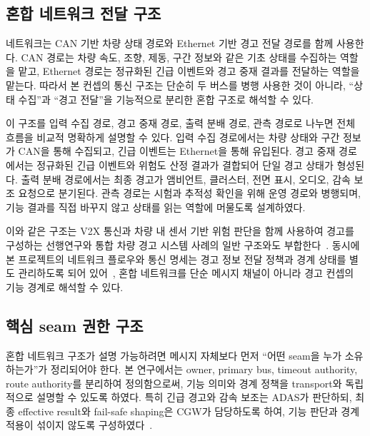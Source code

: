 \documentclass[11pt,a4paper]{article}
\begin{document}
\subsection{혼합 네트워크 전달 구조}

네트워크는 CAN 기반 차량 상태 경로와 Ethernet 기반 경고 전달 경로를 함께 사용한다. CAN 경로는 차량 속도, 조향, 제동, 구간 정보와 같은 기초 상태를 수집하는 역할을 맡고, Ethernet 경로는 정규화된 긴급 이벤트와 경고 중재 결과를 전달하는 역할을 맡는다. 따라서 본 컨셉의 통신 구조는 단순히 두 버스를 병행 사용한 것이 아니라, ``상태 수집''과 ``경고 전달''을 기능적으로 분리한 혼합 구조로 해석할 수 있다.

이 구조를 입력 수집 경로, 경고 중재 경로, 출력 분배 경로, 관측 경로로 나누면 전체 흐름을 비교적 명확하게 설명할 수 있다. 입력 수집 경로에서는 차량 상태와 구간 정보가 CAN을 통해 수집되고, 긴급 이벤트는 Ethernet을 통해 유입된다. 경고 중재 경로에서는 정규화된 긴급 이벤트와 위험도 산정 결과가 결합되어 단일 경고 상태가 형성된다. 출력 분배 경로에서는 최종 경고가 앰비언트, 클러스터, 전면 표시, 오디오, 감속 보조 요청으로 분기된다. 관측 경로는 시험과 추적성 확인을 위해 운영 경로와 병행되며, 기능 결과를 직접 바꾸지 않고 상태를 읽는 역할에 머물도록 설계하였다.

이와 같은 구조는 V2X 통신과 차량 내 센서 기반 위험 판단을 함께 사용하여 경고를 구성하는 선행연구와 통합 차량 경고 시스템 사례의 일반 구조와도 부합한다~\cite{sensors_v2x_collision,nhtsa_ivbss}. 동시에 본 프로젝트의 네트워크 플로우와 통신 명세는 경고 정보 전달 정책과 경계 상태를 별도 관리하도록 되어 있어~\cite{comm_spec,nw_flow}, 혼합 네트워크를 단순 메시지 채널이 아니라 경고 컨셉의 기능 경계로 해석할 수 있다.

\subsection{핵심 seam 권한 구조}

혼합 네트워크 구조가 설명 가능하려면 메시지 자체보다 먼저 ``어떤 seam을 누가 소유하는가''가 정리되어야 한다. 본 연구에서는 owner, primary bus, timeout authority, route authority를 분리하여 정의함으로써, 기능 의미와 경계 정책을 transport와 독립적으로 설명할 수 있도록 하였다. 특히 긴급 경고와 감속 보조는 ADAS가 판단하되, 최종 effective result와 fail-safe shaping은 CGW가 담당하도록 하여, 기능 판단과 경계 적용이 섞이지 않도록 구성하였다~\cite{comm_spec,sysvar_spec}.
\end{document}
